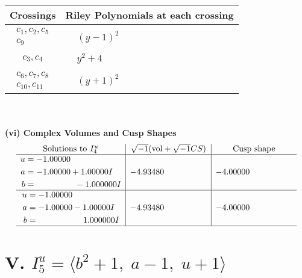 \documentclass[1p]{elsarticle_modified}
\theoremstyle{definition}
\newcommand{\I}{\sqrt{-1}}
\begin{document}
\begin{tabular}{m{50pt}|m{274pt}}
Crossings & \hspace{64pt}Riley Polynomials at each crossing \\
\hline $$\begin{aligned}c_{1},c_{2},c_{5}\\c_{9}\end{aligned}$$&$\begin{aligned}
&(y-1)^2
\end{aligned}$\\
\hline $$\begin{aligned}c_{3},c_{4}\end{aligned}$$&$\begin{aligned}
&y^2+4
\end{aligned}$\\
\hline $$\begin{aligned}c_{6},c_{7},c_{8}\\c_{10},c_{11}\end{aligned}$$&$\begin{aligned}
&(y+1)^2
\end{aligned}$\\
\hline
\end{tabular}\\~\\
\newpage\flushleft \textbf{(vi) Complex Volumes and Cusp Shapes}
$$\begin{array}{c|c|c}  
\text{Solutions to }I^u_{4}& \I (\text{vol} + \sqrt{-1}CS) & \text{Cusp shape}\\
 \hline 
\begin{aligned}
u &= -1.00000\phantom{ +0.000000I} \\
a &= -1.00000 + 1.00000 I \\
b &= \phantom{-0.000000 } -1.000000 I\end{aligned}
 & -4.93480\phantom{ +0.000000I} & -4.00000\phantom{ +0.000000I} \\ \hline\begin{aligned}
u &= -1.00000\phantom{ +0.000000I} \\
a &= -1.00000 - 1.00000 I \\
b &= \phantom{-0.000000 -}1.000000 I\end{aligned}
 & -4.93480\phantom{ +0.000000I} & -4.00000\phantom{ +0.000000I}\\
 \hline 
 \end{array}$$\newpage\newpage\renewcommand{\arraystretch}{1}
\centering \section*{V. $I^u_{5}= \langle b^2+1,\;a-1,\;u+1 \rangle$}
\end{document}
